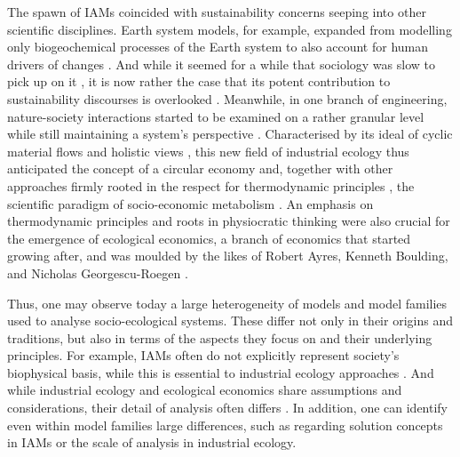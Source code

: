 \documentclass{article}
\begin{document}
\begin{refsection}
The spawn of IAMs coincided with sustainability concerns seeping into other scientific disciplines. Earth system models, for example, expanded from modelling only biogeochemical processes of the Earth system to also account for human drivers of changes \parencite{flato_2011}.\footnotemark{} And while it seemed for a while that sociology was slow to pick up on it \parencite{passerini_1998}, it is now rather the case that its potent contribution to sustainability discourses is overlooked \parencite{longo_2021}. Meanwhile, in one branch of engineering, nature-society interactions started to be examined on a rather granular level while still maintaining a system's perspective \parencite{frosch_1989,ausubel_1992}. Characterised by its ideal of cyclic material flows and holistic views \parencite{jelinski_1992}, this new field of industrial ecology thus anticipated the concept of a circular economy \parencite{kalmykova_2018,merli_2018} and, together with other approaches firmly rooted in the respect for thermodynamic principles \parencite{haberl_2019}, the scientific paradigm of socio-economic metabolism \parencite{pauliuk_2015}. An emphasis on thermodynamic principles and roots in physiocratic thinking were also crucial for the emergence of ecological economics, a branch of economics that started growing after, and was moulded by the likes of Robert Ayres, Kenneth Boulding, and Nicholas Georgescu-Roegen \parencite{cleveland_1999}.


Thus, one may observe today a large heterogeneity of models and model families used to analyse socio-ecological systems. These differ not only in their origins and traditions, but also in terms of the aspects they focus on and their underlying principles. For example, IAMs often do not explicitly represent society's biophysical basis, while this is essential to industrial ecology approaches \parencite{pauliuk_2017}. And while industrial ecology and ecological economics share assumptions and considerations, their detail of analysis often differs \parencite{kronenberg_2006}. In addition, one can identify even within model families large differences, such as regarding solution concepts in IAMs or the scale of analysis in industrial ecology.


\end{refsection}
\end{document}

